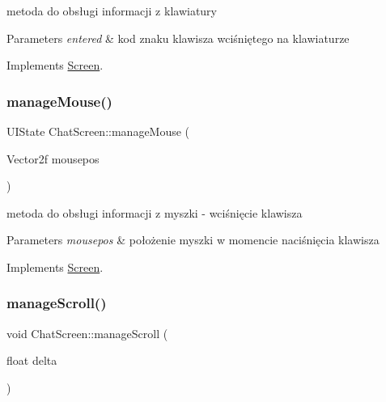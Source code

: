 metoda do obsługi informacji z klawiatury 


\begin{DoxyParams}{Parameters}
{\em entered} & kod znaku klawisza wciśniętego na klawiaturze \\
\hline
\end{DoxyParams}


Implements \mbox{\hyperlink{class_screen_a5b385381d2ba942567f4317e916c9951}{Screen}}.

\mbox{\label{class_chat_screen_a0367fc37c8e860bc044915b9d8b78682}} 
\subsubsection{\texorpdfstring{manageMouse()}{manageMouse()}}
{\footnotesize\ttfamily U\+I\+State Chat\+Screen\+::manage\+Mouse (\begin{DoxyParamCaption}\item[{Vector2f}]{mousepos }\end{DoxyParamCaption})\hspace{0.3cm}{\ttfamily [virtual]}}



metoda do obsługi informacji z myszki -\/ wciśnięcie klawisza 


\begin{DoxyParams}{Parameters}
{\em mousepos} & położenie myszki w momencie naciśnięcia klawisza \\
\hline
\end{DoxyParams}


Implements \mbox{\hyperlink{class_screen_aee89e0a473a855ddd0ae9cd38c5f2529}{Screen}}.

\mbox{\label{class_chat_screen_abd1fd89f6ecc5ddbc233a04e571de9be}} 
\subsubsection{\texorpdfstring{manageScroll()}{manageScroll()}}
{\footnotesize\ttfamily void Chat\+Screen\+::manage\+Scroll (\begin{DoxyParamCaption}\item[{float}]{delta }\end{DoxyParamCaption})\hspace{0.3cm}{\ttfamily [virtual]}}



